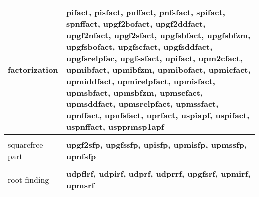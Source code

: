 \begin{center}
\begin{tabular}{|p{1.1in}|p{4.0in}|}
factorization & 
{\bf pifact, pisfact, pnffact, pnfsfact, spifact, spnffact, upgf2bofact, 
        upgf2ddfact, upgf2nfact, upgf2sfact, \newline
        upgfsbfact, upgfsbfzm, upgfsbofact, upgfscfact, \newline
        upgfsddfact, upgfsrelpfac, upgfssfact, upifact, \newline
        upm2cfact, upmibfact, upmibfzm, upmibofact, \newline
        upmicfact, upmiddfact, upmirelpfact, upmisfact, \newline
        upmsbfact, upmsbfzm, upmscfact,
        upmsddfact, \newline
        upmsrelpfact, upmssfact, upnffact, upnfsfact, \newline
        uprfact, uspiapf, uspifact, uspnffact, uspprmsp1apf }\\[1.5ex]
\hline &\\[-1.3ex]

squarefree part & 
{\bf upgf2sfp, upgfssfp, upisfp, upmisfp, upmssfp, upnfsfp }\\[1.5ex]
\hline &\\[-1.3ex]

root finding & 
{\bf udpflrf, udpirf, udprf, udprrf, upgfsrf, upmirf, upmsrf }\\[1.5ex]
\hline 
\end{tabular}
\end{center}

\newpage

